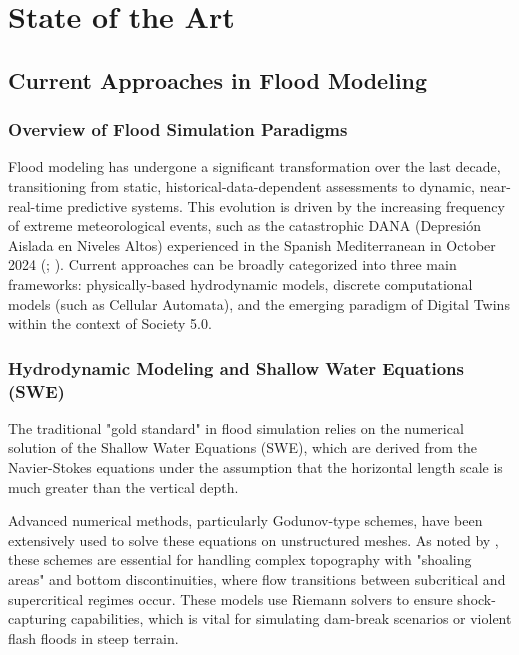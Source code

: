 \chapter{State of the Art}
\label{chapter:state_of_the_art}

\section{Current Approaches in Flood Modeling}

\subsection{Overview of Flood Simulation Paradigms}

Flood modeling has undergone a significant transformation over the last decade, transitioning from static, 
historical-data-dependent assessments to dynamic, near-real-time predictive systems. This evolution is driven by the 
increasing frequency of extreme meteorological events, such as the catastrophic DANA (Depresión Aislada en Niveles Altos) 
experienced in the Spanish Mediterranean in October 2024 (\cite{SeguraBeltran2025}; \cite{Muoz2025}). Current approaches 
can be broadly categorized into three main frameworks: physically-based hydrodynamic models, discrete computational models 
(such as Cellular Automata), and the emerging paradigm of Digital Twins within the context of Society 5.0.


\subsection{Hydrodynamic Modeling and Shallow Water Equations (SWE)}

The traditional "gold standard" in flood simulation relies on the numerical solution of the Shallow Water Equations (SWE), 
which are derived from the Navier-Stokes equations under the assumption that the horizontal length scale is much greater 
than the vertical depth.

Advanced numerical methods, particularly Godunov-type schemes, have been extensively used to solve these equations on 
unstructured meshes. As noted by \cite{Aleksyuk2017}, these schemes are essential for handling complex topography 
with "shoaling areas" and bottom discontinuities, where flow transitions between subcritical and supercritical regimes 
occur. These models use Riemann solvers to ensure shock-capturing capabilities, which is vital for simulating dam-break 
scenarios or violent flash floods in steep terrain.


